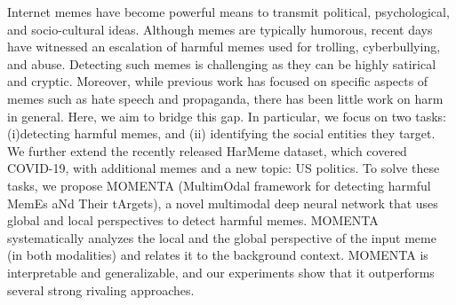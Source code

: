 Internet memes have become powerful means to transmit political, psychological, and socio-cultural ideas. Although memes are typically humorous, recent days have witnessed an escalation of harmful memes used for trolling, cyberbullying, and abuse. Detecting such memes is challenging as they can be highly satirical and cryptic. Moreover, while previous work has focused on specific aspects of memes such as hate speech and propaganda, there has been little work on harm in general. Here, we aim to bridge this gap. In particular, we focus on two tasks: (i)detecting harmful memes, and (ii) identifying the social entities they target. We further extend the recently released HarMeme dataset, which covered COVID-19, with additional memes and a new topic: US politics. To solve these tasks, we propose MOMENTA (MultimOdal framework for detecting harmful MemEs aNd Their tArgets), a novel multimodal deep neural network that uses global and local perspectives to detect harmful memes. MOMENTA systematically analyzes the local and the global perspective of the input meme (in both modalities) and relates it to the background context. MOMENTA is interpretable and generalizable, and our experiments show that it outperforms several strong rivaling approaches.

